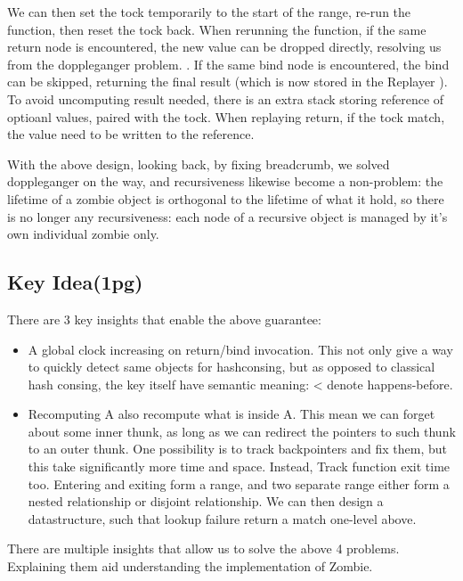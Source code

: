We can then set the tock temporarily to the start of the range, re-run the function, then reset the tock back. When rerunning the function, if the same return node is encountered, the new value can be dropped directly, resolving us from the doppleganger problem. . If the same bind node is encountered, the bind can be skipped, returning the final result (which is now stored in the Replayer ). To avoid uncomputing result needed, there is an extra stack storing reference of optioanl values, paired with the tock. When replaying return, if the tock match, the value need to be written to the reference.

With the above design, looking back, by fixing breadcrumb, we solved doppleganger on the way, and recursiveness likewise become a non-problem: the lifetime of a zombie object is orthogonal to the lifetime of what it hold, so there is no longer any recursiveness: each node of a recursive object is managed by it's own individual zombie only.
\subsection{Key Idea(1pg)}

There are 3 key insights that enable the above guarantee:
\begin{itemize}
	\item A global clock increasing on return/bind invocation. This not only give a way to quickly detect same objects for hashconsing, but as opposed to classical hash consing, the key itself have semantic meaning: < denote happens-before.
	\item Recomputing A also recompute what is inside A. This mean we can forget about some inner thunk, as long as we can redirect the pointers to such thunk to an outer thunk. One possibility is to track backpointers and fix them, but this take significantly more time and space. Instead, Track function exit time too. Entering and exiting form a range, and two separate range either form a nested relationship or disjoint relationship. We can then design a datastructure, such that lookup failure return a match one-level above.
\end{itemize}


There are multiple insights that allow us to solve the above 4 problems. Explaining them aid understanding the implementation of Zombie.


